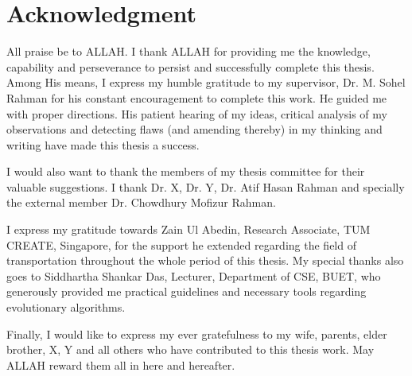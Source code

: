 \chapter*{Acknowledgment}

All praise be to ALLAH. I thank ALLAH for providing me the knowledge, capability and perseverance to persist and successfully complete this thesis. Among His means, I express my  humble gratitude to my supervisor, Dr. M. Sohel Rahman for his constant encouragement to complete this work. He guided me with proper directions. His patient hearing of my ideas, critical analysis of my observations and detecting flaws (and amending thereby) in my thinking and writing have made this thesis a success.

I would also want to thank the members of my thesis committee for their valuable
suggestions. I thank  Dr. X, Dr. Y, Dr. Atif Hasan Rahman and specially the external member Dr. Chowdhury Mofizur Rahman.

I express my gratitude towards Zain Ul Abedin, Research Associate, TUM CREATE, Singapore, for the support he extended regarding the field of transportation throughout the whole period of this thesis. My special thanks also goes to Siddhartha Shankar Das, Lecturer, Department of CSE, BUET, who generously provided me practical guidelines and necessary tools regarding evolutionary algorithms.  

Finally, I would like to express my ever gratefulness to my wife, parents, elder brother, X, Y and all others who have contributed to this thesis work. May ALLAH reward them all in here and hereafter.